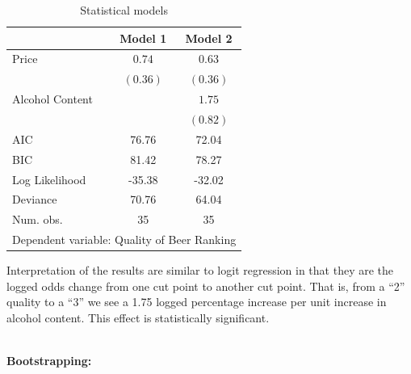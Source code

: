 \documentclass[12pt]{article}\usepackage[]{graphicx}\usepackage[]{color}
\begin{document}
\begin{flushleft}
\begin{table}[h!]
\caption{Statistical models}
\begin{center}
\begin{tabular}{l c c }
\hline
 & Model 1 & Model 2 \\
\hline
Price           & $0.74$   & $0.63$   \\
                & $(0.36)$ & $(0.36)$ \\
Alcohol Content &          & $1.75$   \\
                &          & $(0.82)$ \\
\hline
AIC             & 76.76    & 72.04    \\
BIC             & 81.42    & 78.27    \\
Log Likelihood  & -35.38   & -32.02   \\
Deviance        & 70.76    & 64.04    \\
Num. obs.       & 35       & 35       \\
\hline
\multicolumn{3}{l}{\scriptsize{Dependent variable: Quality of Beer Ranking}}
\end{tabular}
\end{center}
\end{table}



Interpretation of the results are similar to logit regression in that they are the logged odds change from one cut point to another cut point. That is, from a ``2'' quality to a ``3'' we see a 1.75 logged percentage increase per unit increase in alcohol content. This effect is statistically significant.

\hfill \\
\noindent \textbf{Bootstrapping:}


\end{flushleft}
\end{document}
